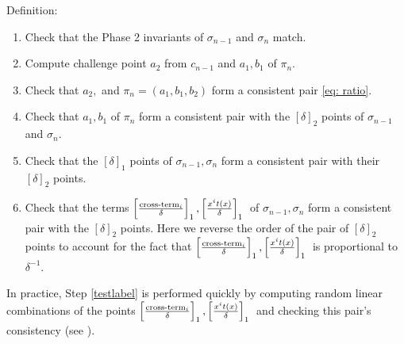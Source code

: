 Definition:
\begin{enumerate}
    \item Check that the Phase 2 invariants of $\sigma_{n-1}$ and $\sigma_n$ match.
    \item Compute challenge point $a_2$ from $c_{n-1}$ and $a_1, b_1$ of $\pi_n$.
    \item Check that $a_2,$ and $\pi_n = (a_1, b_1, b_2)$ form a consistent pair \eqref{eq: ratio}.
    \item Check that $a_1, b_1$ of $\pi_n$ form a consistent pair with the $[\delta]_2$ points of $\sigma_{n-1}$ and $\sigma_n$. 
    \item Check that the $[\delta]_1$ points of $\sigma_{n-1}, \sigma_n$ form a consistent pair with their $[\delta]_2$ points.
    \item\label{testlabel} Check that the terms $\left[\frac{\text{cross-term}_i }{\delta}\right]_1, \left[ \frac{x^i t(x)}{\delta} \right]_1{}$ of $\sigma_{n-1}, \sigma_n$ form a consistent pair with the $[\delta]_2$ points. Here we reverse the order of the pair of $[\delta]_2$ points to account for the fact that $\left[\frac{\text{cross-term}_i }{\delta}\right]_1, \left[ \frac{x^i t(x)}{\delta} \right]_1{}$ is proportional to $\delta^{-1}$.
\end{enumerate}
In practice, Step \ref{testlabel} is performed quickly by computing random linear combinations of the points $\left[\frac{\text{cross-term}_i }{\delta}\right]_1, \left[ \frac{x^i t(x)}{\delta} \right]_1{}$ and checking this pair's consistency (see \cite{bowe19}).
